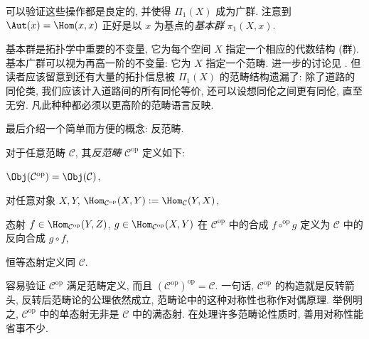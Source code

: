 \begin{example}[基本广群]
	可以验证这些操作都是良定的, 并使得 $\Pi_1(X)$ 成为广群. 注意到 $\Aut(x) = \Hom(x,x)$ 正好是以 $x$ 为基点的\emph{基本群} $\pi_1(X, x)$.

	基本群是拓扑学中重要的不变量, 它为每个空间 $X$ 指定一个相应的代数结构 (群). 基本广群可以视为再高一阶的不变量: 它为 $X$ 指定一个范畴. 进一步的讨论见 \cite[Chapter 2]{May99}. 但读者应该留意到还有大量的拓扑信息被 $\Pi_1(X)$ 的范畴结构遗漏了: 除了道路的同伦类, 我们应该计入道路间的所有同伦等价, 还可以设想同伦之间更有同伦, 直至无穷. 凡此种种都必须以更高阶的范畴语言反映.
\end{example}

最后介绍一个简单而方便的概念: 反范畴.
\begin{definition}
	对于任意范畴 $\mathcal{C}$, 其\emph{反范畴} $\mathcal{C}^\text{op}$ 定义如下:
	\begin{compactitem}
		\item $\Obj(\mathcal{C}^{\text{op}}) = \Obj(\mathcal{C})$,
		\item 对任意对象 $X, Y$, $\Hom_{\mathcal{C}^{\text{op}}}(X, Y) := \Hom_{\mathcal{C}}(Y, X)$,
		\item 态射 $f \in \Hom_{\mathcal{C}^{\text{op}}}(Y, Z)$, $g \in \Hom_{\mathcal{C}^{\text{op}}}(X, Y)$ 在 $\mathcal{C}^{\text{op}}$ 中的合成 $f \circ^\text{op} g$ 定义为 $\mathcal{C}$ 中的反向合成 $g \circ f$,
		\item 恒等态射定义同 $\mathcal{C}$.
	\end{compactitem}
\end{definition}
容易验证 $\mathcal{C}^\text{op}$ 满足范畴定义, 而且 $(\mathcal{C}^\text{op})^{\text{op}} = \mathcal{C}$. 一句话, $\mathcal{C}^\text{op}$ 的构造就是反转箭头, 反转后范畴论的公理依然成立, 范畴论中的这种对称性也称作对偶原理. 举例明之, $\mathcal{C}^\text{op}$ 中的单态射无非是 $\mathcal{C}$ 中的满态射. 在处理许多范畴论性质时, 善用对称性能省事不少.

